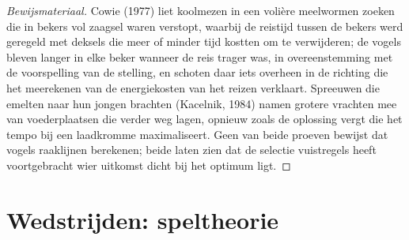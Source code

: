 \begin{proof}[Bewijsmateriaal]
Cowie (1977) liet koolmezen in een volière meelwormen zoeken die in
bekers vol zaagsel waren verstopt, waarbij de reistijd tussen de bekers
werd geregeld met deksels die meer of minder tijd kostten om te
verwijderen; de vogels bleven langer in elke beker wanneer de reis
trager was, in overeenstemming met de voorspelling van de stelling, en
schoten daar iets overheen in de richting die het meerekenen van de
energiekosten van het reizen verklaart. Spreeuwen die emelten naar hun
jongen brachten (Kacelnik, 1984) namen grotere vrachten mee van
voederplaatsen die verder weg lagen, opnieuw zoals de oplossing vergt
die het tempo bij een laadkromme maximaliseert. Geen van beide proeven
bewijst dat vogels raaklijnen berekenen; beide laten zien dat de
selectie vuistregels heeft voortgebracht wier uitkomst dicht bij het
optimum ligt.
\end{proof}

\section{Wedstrijden: speltheorie}

